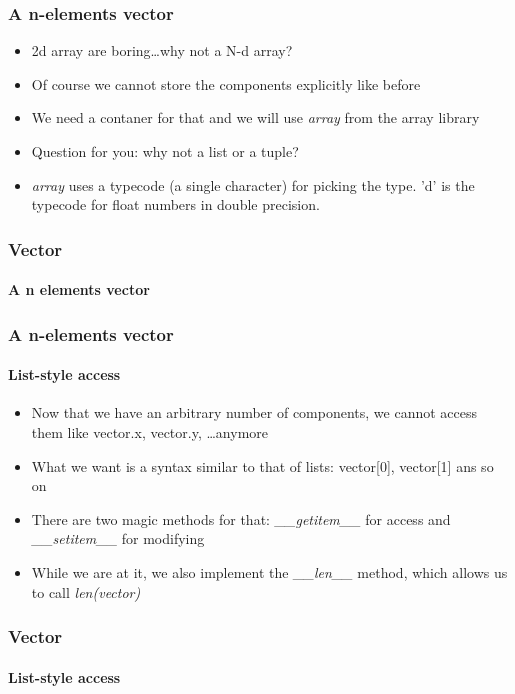\documentclass[9pt]{beamer}
\begin{document}
\begin{frame}
  \frametitle{A n-elements vector}
  
  \begin{itemize}
    \item 2d array are boring\dots why not a N-d array?
    \medskip
    \item Of course we cannot store the components explicitly like before
    \medskip
    \item We need a contaner for that and we will use \emph{array} from the 
          array library
    \medskip
    \item Question for you: why not a list or a tuple?
    \medskip
    \item \emph{array} uses a typecode (a single character) for picking the
          type. 'd' is the typecode for float numbers in double precision. 
  \end{itemize}
  
\end{frame}


\begin{frame}
  \frametitle{Vector}
  \framesubtitle{A n elements vector}
  
\end{frame}


\begin{frame}
  \frametitle{A n-elements vector}
  \framesubtitle{List-style access}
  
  \begin{itemize}
    \item Now that we have an arbitrary number of components, we cannot access them like 
          vector.x, vector.y, \dots anymore
    \medskip
    \item What we want is a syntax similar to that of lists: vector[0], vector[1]
          ans so on
    \medskip
    \item There are two magic methods for that: \emph{\_\_getitem\_\_} for access 
          and \emph{\_\_setitem\_\_} for modifying
    \medskip
    \item While we are at it, we also implement the \emph{\_\_len\_\_} method,
          which allows us to call \emph{len(vector)}
  \end{itemize}
  
\end{frame}


\begin{frame}
  \frametitle{Vector}
  \framesubtitle{List-style access}
  
\end{frame}
\end{document}
